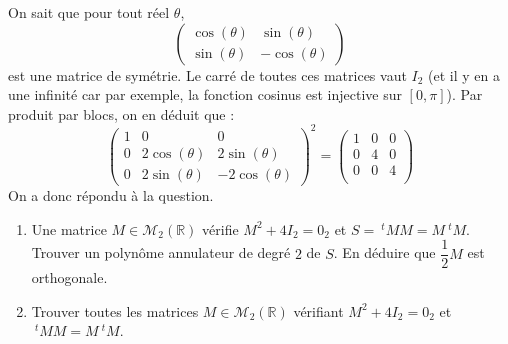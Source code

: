 \documentclass[a4paper,10pt]{report}
\begin{document}
\corr On sait que pour tout réel $\theta$,
$$ \begin{pmatrix}
\cos(\theta) & \sin(\theta) \\
\sin(\theta) & -\cos(\theta) 
\end{pmatrix}$$
est une matrice de symétrie. Le carré de toutes ces matrices vaut $I_2$ (et il y en a une infinité car par exemple, la fonction cosinus est injective sur $[0, \pi]$). Par produit par blocs, on en déduit que :
$$ \begin{pmatrix}
1 & 0 & 0 \\
0& 2\cos(\theta) & 2\sin(\theta) \\
0& 2\sin(\theta) & -2\cos(\theta) 
\end{pmatrix}^2= \begin{pmatrix}
1 & 0 & 0 \\
0 & 4 & 0 \\
0 & 0 & 4 \\
\end{pmatrix}$$
On a donc répondu à la question.

\begin{Exercice}{}
\begin{enumerate}
\item Une matrice $M \in \mathcal{M}_2(\mathbb{R})$ vérifie $M^2+4I_2=0_2$ et $S=~^tM M = M ~^tM$. Trouver un polynôme annulateur de degré $2$ de $S$. En déduire que $\dfrac{1}{2}M$ est orthogonale.
\item Trouver toutes les matrices $M \in \mathcal{M}_2(\mathbb{R})$ vérifiant $M^2+4I_2=0_2$ et $~^tM M = M ~^tM$.
\end{enumerate}
\end{Exercice}
\end{document}
